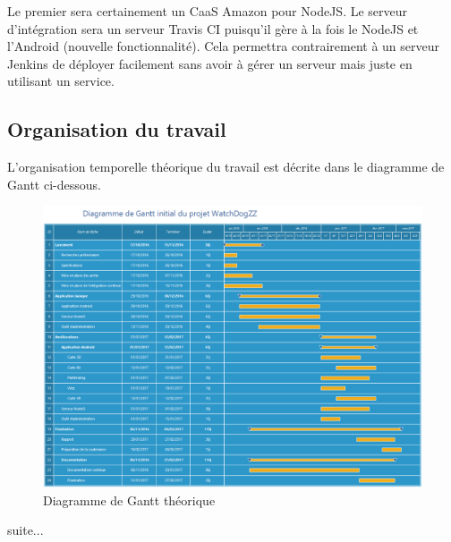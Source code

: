 Le premier sera certainement un CaaS Amazon pour NodeJS. Le serveur d'intégration sera un serveur Travis CI puisqu'il gère à la fois le NodeJS et l'Android (nouvelle fonctionnalité). Cela permettra contrairement à un serveur Jenkins de déployer facilement sans avoir à gérer un serveur mais juste en utilisant un service.

\subsection{Organisation du travail}

L'organisation temporelle théorique du travail est décrite dans le diagramme de Gantt ci-dessous.

\begin{landscape}
    \begin{figure}[h]
        \centering
        \includegraphics[height=\textwidth]{../gantt_initial.png}
        \caption{Diagramme de Gantt théorique}
    \end{figure}
\end{landscape}

suite...